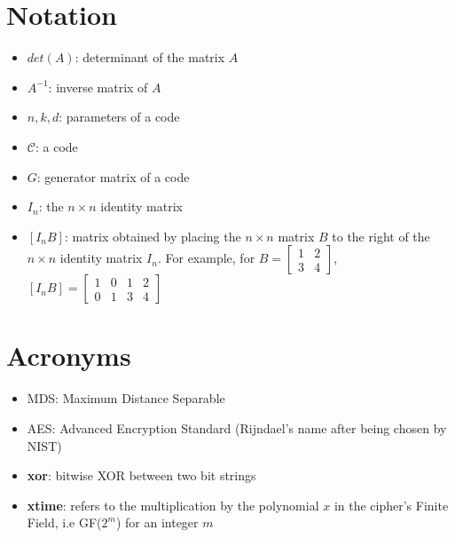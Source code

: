 \documentclass{report}
\begin{document}
\section{Notation}
\begin{itemize}
    \item $det(A)$: determinant of the matrix $A$
    \item $A^{-1}$: inverse matrix of $A$
    \item $n, k, d$: parameters of a code
    \item $\mathcal{C}$: a code
    \item $G$: generator matrix of a code
    \item $I_n$: the $n \times n$ identity matrix
    \item $[I_nB]$: matrix obtained by placing the $n \times n$ matrix $B$ to the right of the $n \times n$ identity matrix $I_n$. For example, for $B = \begin{bmatrix}1 & 2 \\ 3 & 4\end{bmatrix}$, $[I_nB] = \begin{bmatrix} 1 & 0 & 1 & 2 \\ 0 & 1 & 3 & 4\end{bmatrix}$
\end{itemize}

\section{Acronyms}
\begin{itemize}
    \item MDS: Maximum Distance Separable
    \item AES: Advanced Encryption Standard (Rijndael's name after being chosen by NIST)
    \item \textbf{xor}: bitwise XOR between two bit strings
    \item \textbf{xtime}: refers to the multiplication by the polynomial $x$ in the cipher's Finite Field, i.e GF($2^m$) for an integer $m$
\end{itemize}
\end{document}
